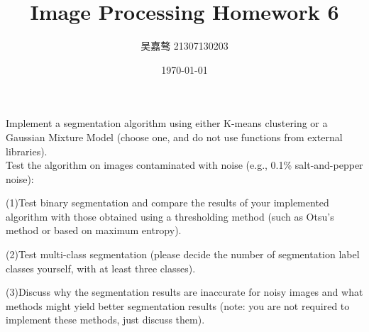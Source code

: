 \documentclass[UTF8]{ctexart}
\title{\textbf{Image Processing Homework 6}}
\author{吴嘉骜 21307130203}
\date{\today}
\begin{document}
\maketitle

\noindent
\section{}
\setlength{\parindent}{0pt}
Implement a segmentation algorithm using either K-means clustering or a Gaussian Mixture Model (choose one, and do not use functions from external libraries).\\
Test the algorithm on images contaminated with noise (e.g., 0.1\% salt-and-pepper noise):

(1)Test binary segmentation and compare the results of your implemented algorithm with those obtained using a thresholding method (such as Otsu's method or based on maximum entropy).

(2)Test multi-class segmentation (please decide the number of segmentation label classes yourself, with at least three classes).

(3)Discuss why the segmentation results are inaccurate for noisy images and what methods might yield better segmentation results (note: you are not required to implement these methods, just discuss them).
\end{document}
